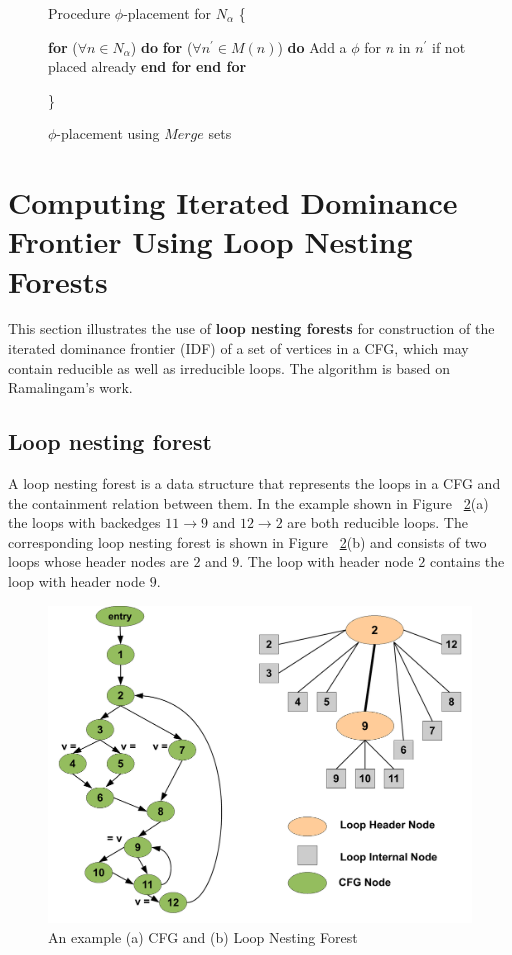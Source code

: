 {\begin{figure}[!ht]
\begin{minipage}[t]{5in}
\setcounter{linectr}{0}

Procedure $\phi$-placement for $N_{\alpha}$
\{
\begin{code}
 {\bf for} ($\forall n \in N_{\alpha}$) {\bf do}
   {\bf for} ($\forall n^{'} \in M(n)$) {\bf do}
       Add a $\phi$ for $n$ in $n^{'}$ if not placed already
   {\bf end for}
 {\bf end for}
\end{code}
\}
\end{minipage}
\caption{$\phi$-placement using $Merge$ sets}
\label{F:phip}
\end{figure} 


\section{Computing Iterated Dominance Frontier Using Loop Nesting Forests}
This section illustrates the use of {\bf loop nesting forests} for construction of the iterated dominance frontier (IDF) of a set of vertices in a CFG, which may contain reducible as well as
irreducible loops. The algorithm is based on Ramalingam's work.

    \subsection{Loop nesting forest}
     A loop nesting forest is a data structure that represents the loops in a CFG and the containment relation between them. In the example shown in Figure ~\ref{fig:lnf}(a) the loops with backedges $11 \rightarrow 9$ and $12 \rightarrow 2$ are both reducible loops. The corresponding loop nesting forest is shown in Figure ~\ref{fig:lnf}(b) and consists of two loops whose header nodes are $2$ and $9$. The loop with header node $2$ contains the loop with header node $9$.

    \begin{figure}[htb]
    \centerline{\includegraphics[scale=0.3]{lnfred.pdf}}
    \caption{An example (a) CFG and (b) Loop Nesting Forest }
    \label{fig:lnf}
    \end{figure} 


}
